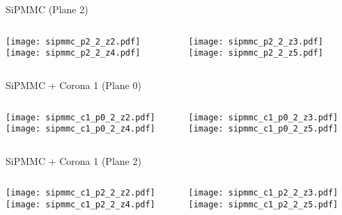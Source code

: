 \documentclass{beamer}
\begin{document}
\begin{frame}{SiPMMC (Plane 2)}
	\begin{columns}[onlytextwidth]
		\begin{column}{0.5\textwidth}
			\texttt{[image: sipmmc\_p2\_2\_z2.pdf]} \\
			\texttt{[image: sipmmc\_p2\_2\_z4.pdf]}
		 \end{column}
		 \begin{column}{0.5\textwidth}
			\texttt{[image: sipmmc\_p2\_2\_z3.pdf]} \\
			\texttt{[image: sipmmc\_p2\_2\_z5.pdf]}
		 \end{column}
 \end{columns}
\end{frame}

\begin{frame}{SiPMMC + Corona 1 (Plane 0)}
	\begin{columns}[onlytextwidth]
		\begin{column}{0.5\textwidth}
			\texttt{[image: sipmmc\_c1\_p0\_2\_z2.pdf]} \\
			\texttt{[image: sipmmc\_c1\_p0\_2\_z4.pdf]}
		 \end{column}
		 \begin{column}{0.5\textwidth}
			\texttt{[image: sipmmc\_c1\_p0\_2\_z3.pdf]} \\
			\texttt{[image: sipmmc\_c1\_p0\_2\_z5.pdf]}
		 \end{column}
 \end{columns}
\end{frame}

\begin{frame}{SiPMMC + Corona 1 (Plane 2)}
	\begin{columns}[onlytextwidth]
		\begin{column}{0.5\textwidth}
			\texttt{[image: sipmmc\_c1\_p2\_2\_z2.pdf]} \\
			\texttt{[image: sipmmc\_c1\_p2\_2\_z4.pdf]}
		 \end{column}
		 \begin{column}{0.5\textwidth}
			\texttt{[image: sipmmc\_c1\_p2\_2\_z3.pdf]} \\
			\texttt{[image: sipmmc\_c1\_p2\_2\_z5.pdf]}
		 \end{column}
 \end{columns}
\end{frame}
\end{document}
